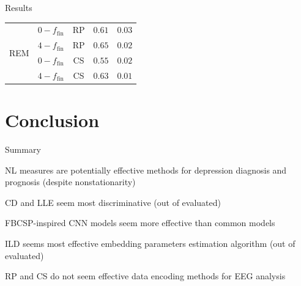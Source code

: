 \documentclass{beamer}
\begin{document}
\begin{frame}{Results}
\begin{table}[tbp]
{\begin{tabular}{|c|c|c|c|c|}
\multirow{4}{*}{REM} & $0-f_{\text{fin}}$ & RP &   $0.61$ & $0.03$ \\ \cline{2-5}               
                     & $4-f_{\text{fin}}$ & RP &       $\mathbf{0.65}$ & $0.02$    \\ \cline{2-5}   
                     & $0-f_{\text{fin}}$ & CS &      $0.55$ & $0.02$ \\ \cline{2-5}               
                     & $4-f_{\text{fin}}$ & CS &      $0.63$ & $0.01$ \\ \hline               
\end{tabular}
}
\end{table}
\end{frame}


\section{Conclusion}


\begin{frame}{Summary}
    \centering
    \begin{enumerate}
        \item NL measures are potentially effective methods for depression diagnosis and prognosis {\scriptsize(despite nonstationarity)}
        \item CD and LLE seem most discriminative {\scriptsize{(out of evaluated)}}
        \item FBCSP-inspired CNN models seem more effective than common models
        {\scriptsize
        \item ILD seems most effective embedding parameters estimation algorithm {\scriptsize(out of evaluated)}
        \item RP and CS do not seem effective data encoding methods for EEG analysis
        }
    \end{enumerate}
    
\end{frame}

\end{document}

